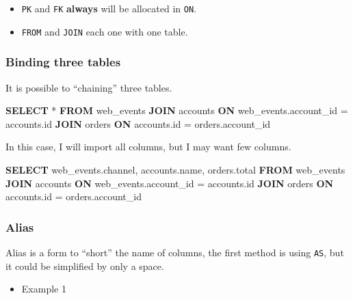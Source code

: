 \documentclass[]{book}
\newenvironment{Shaded}{\begin{snugshade}}{\end{snugshade}}
\newcommand{\KeywordTok}[1]{\textcolor[rgb]{0.13,0.29,0.53}{\textbf{#1}}}
\newcommand{\NormalTok}[1]{#1}
\providecommand{\tightlist}{%
  \setlength{\itemsep}{0pt}\setlength{\parskip}{0pt}}
\begin{document}
\begin{itemize}
\tightlist
\item
  \texttt{PK} and \texttt{FK} \textbf{always} will be allocated in
  \texttt{ON}.
\item
  \texttt{FROM} and \texttt{JOIN} each one with one table.
\end{itemize}

\subsubsection{Binding three tables}\label{binding-three-tables}

It is possible to ``chaining'' three tables.

\begin{Shaded}
\begin{Highlighting}[]
\KeywordTok{SELECT}\NormalTok{ *}
\KeywordTok{FROM}\NormalTok{ web_events}
\KeywordTok{JOIN}\NormalTok{ accounts}
\KeywordTok{ON}\NormalTok{ web_events.account_id = accounts.id}
\KeywordTok{JOIN}\NormalTok{ orders}
\KeywordTok{ON}\NormalTok{ accounts.id = orders.account_id}
\end{Highlighting}
\end{Shaded}

In this case, I will import all columns, but I may want few columns.

\begin{Shaded}
\begin{Highlighting}[]
\KeywordTok{SELECT}\NormalTok{ web_events.channel, accounts.name, orders.total}
\KeywordTok{FROM}\NormalTok{ web_events}
\KeywordTok{JOIN}\NormalTok{ accounts}
\KeywordTok{ON}\NormalTok{ web_events.account_id = accounts.id}
\KeywordTok{JOIN}\NormalTok{ orders}
\KeywordTok{ON}\NormalTok{ accounts.id = orders.account_id}
\end{Highlighting}
\end{Shaded}

\subsubsection{Alias}\label{alias}

Alias is a form to ``short'' the name of columns, the first method is
using \texttt{AS}, but it could be simplified by only a space.

\begin{itemize}
\tightlist
\item
  Example 1
\end{itemize}
\end{document}
